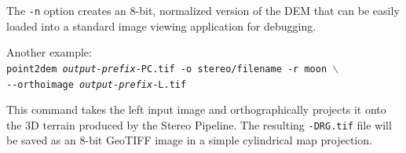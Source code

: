 The {\tt -n} option creates an 8-bit, normalized version of the DEM
that can be easily loaded into a standard image viewing application
for debugging.

Another example: \\
\hspace*{2em}\texttt{point2dem \textit{output-prefix}-PC.tif -o stereo/filename -r moon $\backslash$} \\
\hspace*{4em}\texttt{-\/-orthoimage \textit{output-prefix}-L.tif}

This command takes the left input image and orthographically projects
it onto the 3D terrain produced by the Stereo Pipeline.  The resulting
{\tt *-DRG.tif} file will be saved as an 8-bit GeoTIFF image in a
simple cylindrical map projection.

